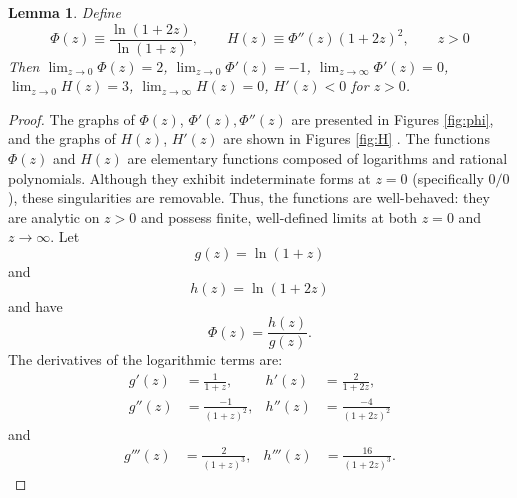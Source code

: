 \documentclass[12pt]{article}
\newtheorem{lemma}[theorem]{Lemma}
\theoremstyle{definition}
\begin{document}
\begin{lemma}\label{Phi}
 Define
\begin{equation}
  \Phi(z)\equiv\frac{\ln(1+2z)}{\ln(1+z)},\qquad H(z) \equiv \Phi''(z)(1+2z)^2,\qquad z>0
\end{equation}  
Then $\lim_{z \to 0} \Phi(z)=2$,  $\lim_{z \to 0} \Phi'(z)=-1$, $\lim_{z \to \infty} \Phi'(z) = 0$, $\lim_{z \to 0} H(z)=3$, $\lim_{z \to \infty} H(z) = 0$, $H'(z)<0$ for $z>0$.
\end{lemma}
 


\begin{proof}
The graphs of $\Phi(z)$, $\Phi'(z),\Phi''(z) $ are presented in Figures \ref{fig:phi}, and the graphs of $H(z)$, $H'(z)$ are shown in Figures \ref{fig:H} . The functions $\Phi(z)$ and $H(z)$ are elementary functions composed of logarithms and rational polynomials. Although they exhibit indeterminate forms at $z=0$ (specifically $0/0$), these singularities are removable. Thus, the functions are well-behaved: they are analytic on $z > 0$ and possess finite, well-defined limits at both $z=0$ and $z \to \infty$.  Let $$g(z) = \ln(1+z)$$ and $$h(z) = \ln(1+2z)$$ and have 
\[
\Phi(z) = \frac{h(z)}{g(z)}.
\]
The derivatives of the logarithmic terms are:
\[
\begin{aligned}
g'(z) &= \frac{1}{1+z}, & h'(z) &= \frac{2}{1+2z}, \\
g''(z) &= \frac{-1}{(1+z)^2}, & h''(z) &= \frac{-4}{(1+2z)^2}
\end{aligned}
\]
and
\[
\begin{aligned}
g'''(z) &= \frac{2}{(1+z)^3}, & h'''(z) &= \frac{16}{(1+2z)^3}.
\end{aligned}
\]


\end{proof}
\end{document}
